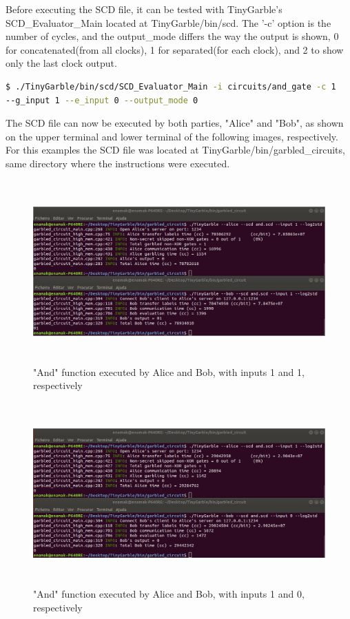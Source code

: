 \begin{refsection}
Before executing the SCD file, it can be tested with TinyGarble's SCD\_Evaluator\_Main located at TinyGarble/bin/scd. The '-c' option is the number of cycles, and the output\_mode differs the way the output is shown, 0 for concatenated(from all clocks), 1 for separated(for each clock), and 2 to show only the last clock output.

\begin{lstlisting}[caption={Testing a SCD file}, language=bash, captionpos=b]
$ ./TinyGarble/bin/scd/SCD_Evaluator_Main -i circuits/and_gate -c 1
--g_input 1 --e_input 0 --output_mode 0
\end{lstlisting}

\newpage

The SCD file can now be executed by both parties, "Alice" and "Bob", as shown on the upper terminal and lower terminal of the following images, respectively.
For this examples the SCD file was located at TinyGarble/bin/garbled\_circuits, same directory where the instructions were executed.

\begin{figure}[H]
	\centering
	\includegraphics[width=1\textwidth, height=7cm]{./sdf/tiny_garble/figures/tinygarble_and_a.png}
    \caption{"And" function executed by Alice and Bob, with inputs 1 and 1, respectively}\label{fig:tinygarble_and_a}
\end{figure}

\begin{figure}[H]
	\centering
	\includegraphics[width=1\textwidth, height=7cm]{./sdf/tiny_garble/figures/tinygarble_and_b.png}
    \caption{"And" function executed by Alice and Bob, with inputs 1 and 0, respectively}\label{fig:tinygarble_and_b}
\end{figure}


\end{refsection}
